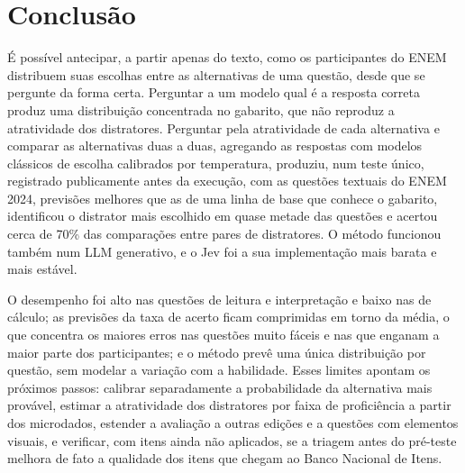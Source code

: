 
\section{Conclusão}\label{sec:conclusao}

É possível antecipar, a partir apenas do texto, como os participantes do ENEM distribuem suas escolhas entre as alternativas de uma questão, desde que se pergunte da forma certa. Perguntar a um modelo qual é a resposta correta produz uma distribuição concentrada no gabarito, que não reproduz a atratividade dos distratores. Perguntar pela atratividade de cada alternativa e comparar as alternativas duas a duas, agregando as respostas com modelos clássicos de escolha calibrados por temperatura, produziu, num teste único, registrado publicamente antes da execução, com as questões textuais do ENEM 2024, previsões melhores que as de uma linha de base que conhece o gabarito, identificou o distrator mais escolhido em quase metade das questões e acertou cerca de 70\% das comparações entre pares de distratores. O método funcionou também num LLM generativo, e o Jev foi a sua implementação mais barata e mais estável.

O desempenho foi alto nas questões de leitura e interpretação e baixo nas de cálculo; as previsões da taxa de acerto ficam comprimidas em torno da média, o que concentra os maiores erros nas questões muito fáceis e nas que enganam a maior parte dos participantes; e o método prevê uma única distribuição por questão, sem modelar a variação com a habilidade. Esses limites apontam os próximos passos: calibrar separadamente a probabilidade da alternativa mais provável, estimar a atratividade dos distratores por faixa de proficiência a partir dos microdados, estender a avaliação a outras edições e a questões com elementos visuais, e verificar, com itens ainda não aplicados, se a triagem antes do pré-teste melhora de fato a qualidade dos itens que chegam ao Banco Nacional de Itens.
